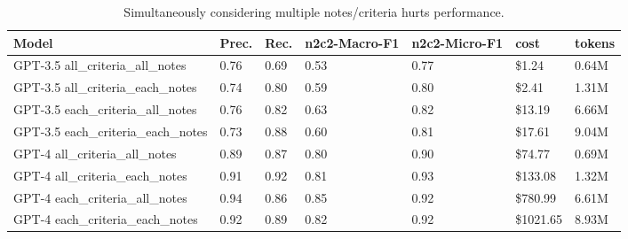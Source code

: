 \begin{table}
\caption{Simultaneously considering multiple notes/criteria hurts performance.}
\label{tab:prompt_strat}
\begin{tabular}{lllllll}
\toprule
Model & Prec. & Rec. & n2c2-Macro-F1 & n2c2-Micro-F1 & cost & tokens \\
\midrule
GPT-3.5 all_criteria_all_notes & 0.76 & 0.69 & 0.53 & 0.77 & \$1.24 & 0.64M \\
GPT-3.5 all_criteria_each_notes & 0.74 & 0.80 & 0.59 & 0.80 & \$2.41 & 1.31M \\
GPT-3.5 each_criteria_all_notes & 0.76 & 0.82 & 0.63 & 0.82 & \$13.19 & 6.66M \\
GPT-3.5 each_criteria_each_notes & 0.73 & 0.88 & 0.60 & 0.81 & \$17.61 & 9.04M \\
GPT-4 all_criteria_all_notes & 0.89 & 0.87 & 0.80 & 0.90 & \$74.77 & 0.69M \\
GPT-4 all_criteria_each_notes & 0.91 & 0.92 & 0.81 & 0.93 & \$133.08 & 1.32M \\
GPT-4 each_criteria_all_notes & 0.94 & 0.86 & 0.85 & 0.92 & \$780.99 & 6.61M \\
GPT-4 each_criteria_each_notes & 0.92 & 0.89 & 0.82 & 0.92 & \$1021.65 & 8.93M \\
\bottomrule
\end{tabular}
\end{table}
